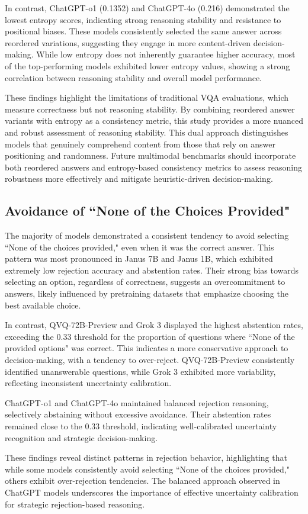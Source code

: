 In contrast, ChatGPT-o1 (0.1352) and ChatGPT-4o (0.216) demonstrated the lowest entropy scores, indicating strong reasoning stability and resistance to positional biases. These models consistently selected the same answer across reordered variations, suggesting they engage in more content-driven decision-making. While low entropy does not inherently guarantee higher accuracy, most of the top-performing models exhibited lower entropy values, showing a strong correlation between reasoning stability and overall model performance.

These findings highlight the limitations of traditional VQA evaluations, which measure correctness but not reasoning stability. By combining reordered answer variants with entropy as a consistency metric, this study provides a more nuanced and robust assessment of reasoning stability. This dual approach distinguishes models that genuinely comprehend content from those that rely on answer positioning and randomness. Future multimodal benchmarks should incorporate both reordered answers and entropy-based consistency metrics to assess reasoning robustness more effectively and mitigate heuristic-driven decision-making.



\subsection{Avoidance of ``None of the Choices Provided"}

The majority of models demonstrated a consistent tendency to avoid selecting ``None of the choices provided," even when it was the correct answer. This pattern was most pronounced in Janus 7B and Janus 1B, which exhibited extremely low rejection accuracy and abstention rates. Their strong bias towards selecting an option, regardless of correctness, suggests an overcommitment to answers, likely influenced by pretraining datasets that emphasize choosing the best available choice.

In contrast, QVQ-72B-Preview and Grok 3 displayed the highest abstention rates, exceeding the 0.33 threshold for the proportion of questions where ``None of the provided options" was correct. This indicates a more conservative approach to decision-making, with a tendency to over-reject. QVQ-72B-Preview consistently identified unanswerable questions, while Grok 3 exhibited more variability, reflecting inconsistent uncertainty calibration.

ChatGPT-o1 and ChatGPT-4o maintained balanced rejection reasoning, selectively abstaining without excessive avoidance. Their abstention rates remained close to the 0.33 threshold, indicating well-calibrated uncertainty recognition and strategic decision-making.

These findings reveal distinct patterns in rejection behavior, highlighting that while some models consistently avoid selecting ``None of the choices provided," others exhibit over-rejection tendencies. The balanced approach observed in ChatGPT models underscores the importance of effective uncertainty calibration for strategic rejection-based reasoning.
